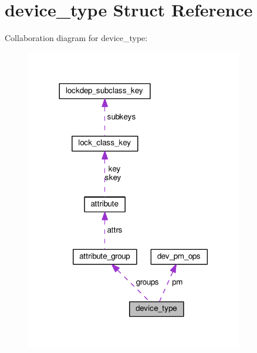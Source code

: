 \hypertarget{structdevice__type}{}\section{device\+\_\+type Struct Reference}
\label{structdevice__type}


Collaboration diagram for device\+\_\+type\+:
\nopagebreak
\begin{figure}[H]
\begin{center}
\leavevmode
\includegraphics[width=269pt]{structdevice__type__coll__graph}
\end{center}
\end{figure}
